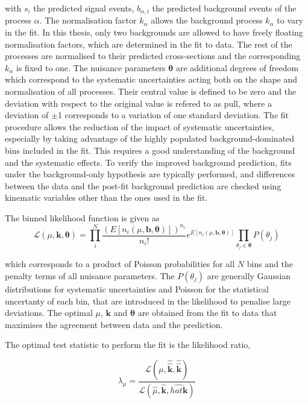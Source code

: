 with $s_i$ the predicted signal events, $b_{\alpha,i}$ the predicted background events of the process $\alpha$. The normalisation factor $k_\alpha$ allows the background process $k_\alpha$ to vary in the fit. In this thesis, only two backgrounds are allowed to have freely floating normalisation factors, which are determined in the fit to data. The rest of the processes are normalised to their predicted cross-sections and the corresponding $k_\alpha$ is fixed to one. The nuisance parameters $\mathbf{\theta}$ are additional degrees of freedom which correspond to the systematic uncertainties acting both on the shape and normalisation of all processes. Their central value is defined to be zero and the deviation with respect to the original value is refered to as pull, where a deviation of $\pm$1 corresponds to a variation of one standard deviation. The fit procedure allows the reduction of the impact of systematic uncertainties, especially by taking advantage of the highly populated background-dominated bins included in the fit. This requires a good understanding of the background and the systematic effects. To verify the improved background prediction, fits under the background-only hypothesis are typically performed, and differences between the data and the post-fit background prediction are checked using kinematic variables other than the ones used in the fit.

The binned likelihood function is given as
\begin{equation}
    \mathscr{L}(\mu,\mathbf{k},\mathbf{\theta}) = \prod_i^N \frac{ (E[n_i(\mu,\mathbf{b},\mathbf{\theta})])^{n_i}}{n_i!}e^{E[n_i(\mu,\mathbf{b},\mathbf{\theta})]}\prod_{\theta_j\in\mathbf{\theta}}P(\theta_j)
\end{equation}

which corresponds to a product of Poisson probabilities for all $N$ bins and the penalty terms of all nuisance parameters. The $P(\theta_j)$ are generally Gaussian distributions for systematic uncertainties and Poisson for the statistical uncertanty of each bin, that are introduced in the likelihood to penalise large deviations.
The optimal $\mu$, $\mathbf{k}$ and $\mathbf{\theta}$ are obtained from the fit to data that maximises the agreement between data and the prediction.

The optimal test statistic to perform the fit is the likelihood ratio, %

\begin{equation}
    \lambda_\mu = \frac{\mathscr{L}(\mu, \hat{\hat{\mathbf{k}}},\hat{\hat{\mathbf{k}}})}{\mathscr{L}(\hat{\mu}, \hat{\mathbf{k}},\hat{hat{\mathbf{k}}})}
\end{equation}

